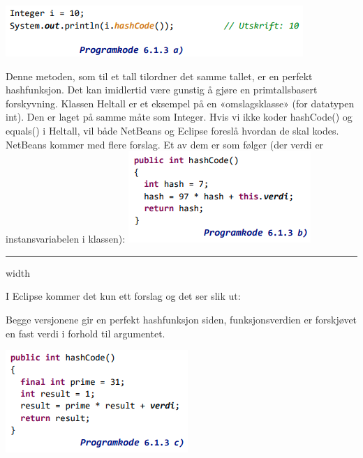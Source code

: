 \documentclass[11pt]{article}
\begin{document}
            \includegraphics[center]{pk-6.1.3a.png}

            \begin{multicols}{2}
                Denne metoden, som til et tall tilordner det samme tallet, er en perfekt hashfunksjon. Det
                kan imidlertid være gunstig å gjøre en primtallsbasert forskyvning. Klassen Heltall er et
                eksempel på en «omslagsklasse» (for datatypen int). Den er laget på samme måte som
                Integer. Hvis vi ikke koder hashCode() og equals() i Heltall, vil både NetBeans og Eclipse
                foreslå hvordan de skal kodes. NetBeans kommer med flere forslag. Et av dem er som følger
                (der verdi er instansvariabelen i klassen):
                \columnbreak
                \includegraphics[center, scale=1.2]{pk-6.1.3b.png}
            \end{multicols}

            \hrule width \textwidth

            \begin{multicols}{2}
                I Eclipse kommer det kun ett forslag og det ser slik ut:

                Begge versjonene gir en perfekt hashfunksjon siden,
                funksjonsverdien er forskjøvet en fast verdi i forhold til argumentet.

                \columnbreak
                \includegraphics[center]{pk-6.1.3c.png}
            \end{multicols}
\end{document}
